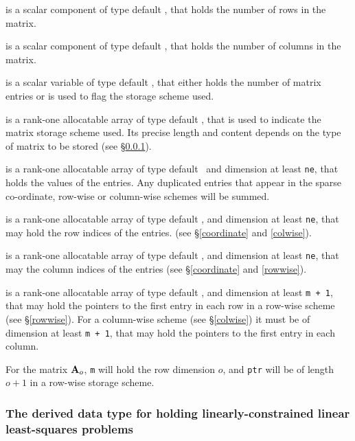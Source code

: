 \documentclass{galahad}
\begin{document}
\begin{description}

 is a scalar component of type default \integer, 
that holds the number of rows in the matrix. 
 
 is a scalar component of type default \integer, 
that holds the number of columns in the matrix. 
 
 is a scalar variable of type default \integer, that either 
holds the number of matrix entries or is used to flag the storage scheme
used. 

 is a rank-one allocatable array of type default \character, that
is used to indicate the matrix storage scheme used. Its precise length and
content depends on the type of matrix to be stored (see \S\ref{typeqp}).

 is a rank-one allocatable array of type default \realdp\, 
and dimension at least {\tt ne}, that holds the values of the entries. 
Any duplicated entries that appear in the sparse 
co-ordinate, row-wise or column-wise schemes will be summed. 

 is a rank-one allocatable array of type default \integer, 
and dimension at least {\tt ne}, that may hold the row indices of the entries. 
(see \S\ref{coordinate} and \ref{colwise}).

 is a rank-one allocatable array of type default \integer, 
and dimension at least {\tt ne}, that may the column indices of the entries
(see \S\ref{coordinate} and \ref{rowwise}).

 is a rank-one allocatable array of type default \integer, 
and dimension at least {\tt m + 1}, that may hold the pointers to
the first entry in each row in a row-wise scheme (see \S\ref{rowwise}). 
For a column-wise scheme (see \S\ref{colwise}) it must be of 
dimension at least {\tt m + 1}, that may hold the pointers to
the first entry in each column.

\end{description}
For the matrix ${\mathbf{A}}_o$, {\tt m} will hold the row dimension $o$, and
{\tt ptr} will be of length $o+1$ in a row-wise storage scheme.



\subsubsection{The derived data type for holding linearly-constrained linear least-squares problems}
\label{typeqp}
\end{document}

